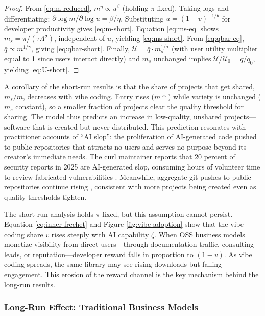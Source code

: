\documentclass[11pt,a4paper]{article}
\theoremstyle{definition}
\theoremstyle{remark}
\begin{document}
\begin{proof}
From \eqref{eq:m-reduced}, $m^\eta \propto u^{\beta}$ (holding $\pi$ fixed). Taking logs and differentiating: $\partial \log m / \partial \log u = \beta/\eta$. Substituting $u = (1-v)^{-1/\theta}$ for developer productivity gives \eqref{eq:m-short}. Equation \eqref{eq:ms-eq} shows $m_s = \pi/(\tau\Lambda^\sigma)$, independent of $u$, yielding \eqref{eq:ms-short}. From \eqref{eq:qbar-eq}, $\bar{q} \propto m^{1/\gamma}$, giving \eqref{eq:qbar-short}. Finally, $\mathcal{U} = \bar{q} \cdot m_s^{1/\sigma}$ (with user utility multiplier equal to 1 since users interact directly) and $m_s$ unchanged implies $\mathcal{U}/\mathcal{U}_0 = \bar{q}/\bar{q}_0$, yielding \eqref{eq:U-short}.
\end{proof}

A corollary of the short-run results is that the share of projects that
get shared, \(m_s/m\), decreases with vibe coding. Entry rises
(\(m \uparrow\)) while variety is unchanged (\(m_s\) constant), so a
smaller fraction of projects clear the quality threshold for sharing.
The model thus predicts an increase in low-quality, unshared
projects---software that is created but never distributed. This
prediction resonates with practitioner accounts of ``AI slop'': the
proliferation of AI-generated code pushed to public repositories that
attracts no users and serves no purpose beyond its creator's immediate
needs. The curl maintainer reports that 20 percent of security reports
in 2025 are AI-generated slop, consuming hours of volunteer time to
review fabricated vulnerabilities \citep{stenberg-2025}. Meanwhile,
aggregate git pushes to public repositories continue rising
\citep{github-innovation-graph-2025}, consistent with more projects
being created even as quality thresholds tighten.

The short-run analysis holds \(\pi\) fixed, but this assumption cannot
persist. Equation \eqref{eq:inner-frechet} and
Figure \ref{fig:vibe-adoption} show that the vibe coding
share \(v\) rises steeply with AI capability \(\zeta\). When OSS
business models monetize visibility from direct users---through
documentation traffic, consulting leads, or reputation---developer
reward falls in proportion to \((1-v)\). As vibe coding spreads, the
same library may see rising downloads but falling engagement. This
erosion of the reward channel is the key mechanism behind the long-run
results.

\subsubsection{Long-Run Effect: Traditional Business
Models}\label{long-run-effect-traditional-business-models}
\end{document}
